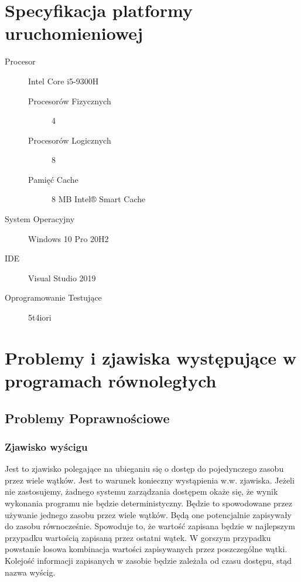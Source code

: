 \documentclass{article}
\begin{document}
    \section{Specyfikacja platformy uruchomieniowej}
        \begin{addmargin}{3em}
            \begin{description}
                \item[Procesor] Intel Core i5-9300H
                    \begin{description}
                        \item[Procesorów Fizycznych] 4
                        \item[Procesorów Logicznych]  8
                        \item[Pamięć Cache]  8 MB Intel® Smart Cache 
                    \end{description} 
                \item[System Operacyjny] Windows 10 Pro 20H2
                \item[IDE] Visual Studio 2019
                \item[Oprogramowanie Testujące] 5t4iori
            \end{description}
        \end{addmargin}
        
    \section{Problemy i zjawiska występujące w programach równoległych}
        \subsection{Problemy Poprawnościowe}
            \subsubsection{Zjawisko wyścigu}
                Jest to zjawisko polegające na ubieganiu się o dostęp do pojedynczego zasobu przez wiele wątków. Jest to warunek konieczny wystąpienia w.w. zjawiska. Jeżeli nie zastosujemy, żadnego systemu zarządzania dostępem okaże się, że wynik wykonania programu nie będzie deterministyczny. Będzie to spowodowane przez używanie jednego zasobu przez wiele wątków. Będą one potencjalnie zapisywały do zasobu równocześnie. Spowoduje to, że wartość zapisana będzie w najlepszym przypadku wartością zapisaną przez ostatni wątek. W gorszym przypadku powstanie losowa kombinacja wartości zapisywanych przez poszczególne wątki. Kolejość informacji zapisanych w zasobie będzie zależała od czasu dostępu, stąd nazwa wyścig.
                
\end{document}
